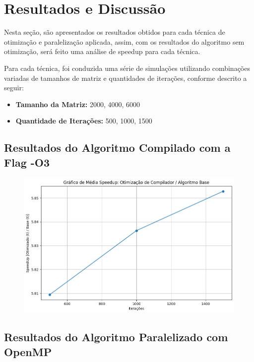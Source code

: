 \section{Resultados e Discussão}

Nesta seção, são apresentados os resultados obtidos para cada técnica de otimização e paralelização aplicada, assim, com os resultados do algoritmo sem otimização, será feito uma análise de speedup para cada técnica.

Para cada técnica, foi conduzida uma série de simulações utilizando combinações variadas de tamanhos de matriz e quantidades de iterações, conforme descrito a seguir:

\begin{itemize}
    \item \textbf{Tamanho da Matriz:} 2000, 4000, 6000
    \item \textbf{Quantidade de Iterações:} 500, 1000, 1500
\end{itemize}

\subsection{Resultados do Algoritmo Compilado com a Flag -O3}

\begin{figure}[H]
    \centering
    \includegraphics[width=1\linewidth]{../assets/O3 - SpeedUp.png}
\end{figure}

\subsection{Resultados do Algoritmo Paralelizado com OpenMP}

